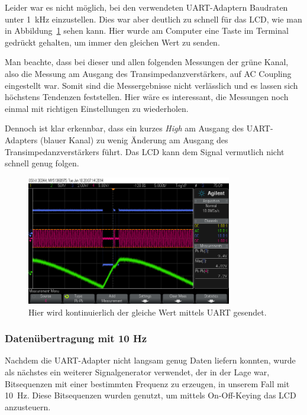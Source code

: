 \documentclass[12pt,a4paper]{article}
\begin{document}
Leider war es nicht möglich, bei den verwendeten UART-Adaptern Baudraten unter \SI{1}{\kilo\hertz} einzustellen. Dies war aber deutlich zu schnell für das LCD, wie man in Abbildung~\ref{fig:uart_continous_key} sehen kann. Hier wurde am Computer eine Taste im Terminal gedrückt gehalten, um immer den gleichen Wert zu senden.

Man beachte, dass bei dieser und allen folgenden Messungen der grüne Kanal, also die Messung am Ausgang des Transimpedanzverstärkers, auf AC Coupling eingestellt war. Somit sind die Messergebnisse nicht verlässlich und es lassen sich höchstens Tendenzen feststellen. Hier wäre es interessant, die Messungen noch einmal mit richtigen Einstellungen zu wiederholen.

Dennoch ist klar erkennbar, dass ein kurzes \textit{High} am Ausgang des UART-Adapters (blauer Kanal) zu wenig Änderung am Ausgang des Transimpedanzverstärkers führt. Das LCD kann dem Signal vermutlich nicht schnell genug folgen.


\begin{figure}[H]
  \centering
    \includegraphics[width=0.8\textwidth]{../measurements/20140610/uart_continous_key/scope_0.png}
  \caption{Hier wird kontinuierlich der gleiche Wert mittels UART gesendet.}
  \label{fig:uart_continous_key}
\end{figure}

\subsubsection{Datenübertragung mit 10 Hz}
Nachdem die UART-Adapter nicht langsam genug Daten liefern konnten, wurde als nächstes ein weiterer Signalgenerator verwendet, der in der Lage war, Bitsequenzen mit einer bestimmten Frequenz zu erzeugen, in unserem Fall mit \SI{10}{\hertz}. Diese Bitsequenzen wurden genutzt, um mittels On-Off-Keying das LCD anzusteuern.
\end{document}
